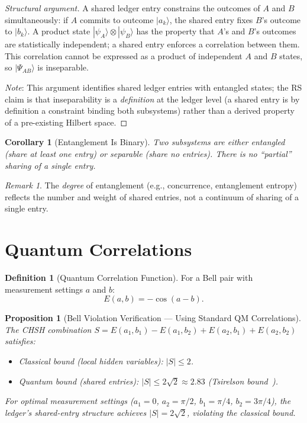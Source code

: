 \documentclass[12pt,a4paper]{article}
\newtheorem{corollary}[theorem]{Corollary}
\newtheorem{proposition}[theorem]{Proposition}
\theoremstyle{definition}
\newtheorem{definition}[theorem]{Definition}
\theoremstyle{remark}
\newtheorem{remark}[theorem]{Remark}
\begin{document}
\begin{proof}[Structural argument]
A shared ledger entry constrains the outcomes of $A$ and $B$
simultaneously: if $A$ commits to outcome $|a_k\rangle$, the
shared entry fixes $B$'s outcome to $|b_k\rangle$.  A product
state $|\psi_A\rangle \otimes |\psi_B\rangle$ has the property
that $A$'s and $B$'s outcomes are statistically independent;
a shared entry enforces a correlation between them.  This correlation
cannot be expressed as a product of independent $A$ and $B$ states,
so $|\Psi_{AB}\rangle$ is inseparable.

\emph{Note}: This argument identifies shared ledger entries with
entangled states; the RS claim is that inseparability is a
\emph{definition} at the ledger level (a shared entry is by
definition a constraint binding both subsystems) rather than a
derived property of a pre-existing Hilbert space.
\end{proof}

\begin{corollary}[Entanglement Is Binary]
Two subsystems are either entangled (share at least one entry) or
separable (share no entries).  There is no ``partial'' sharing of
a single entry.
\end{corollary}

\begin{remark}
The \emph{degree} of entanglement (e.g., concurrence, entanglement
entropy) reflects the number and weight of shared entries, not a
continuum of sharing of a single entry.
\end{remark}

\section{Quantum Correlations}
\label{sec:correlations}

\begin{definition}[Quantum Correlation Function]
For a Bell pair with measurement settings $a$ and $b$:
\begin{equation}
  E(a, b) = -\cos(a - b).
\end{equation}
\end{definition}

\begin{proposition}[Bell Violation Verification --- Using Standard QM Correlations]
\label{thm:bell}
The CHSH combination
$S = E(a_1, b_1) - E(a_1, b_2) + E(a_2, b_1) + E(a_2, b_2)$
satisfies:
\begin{itemize}
  \item Classical bound (local hidden variables):
  $|S| \leq 2$.
  \item Quantum bound (shared entries):
  $|S| \leq 2\sqrt{2} \approx 2.83$ (Tsirelson bound~\cite{Tsirelson1980}).
\end{itemize}
For optimal measurement settings ($a_1 = 0$, $a_2 = \pi/2$,
$b_1 = \pi/4$, $b_2 = 3\pi/4$), the ledger's shared-entry
structure achieves $|S| = 2\sqrt{2}$, violating the classical bound.
\end{proposition}
\end{document}
